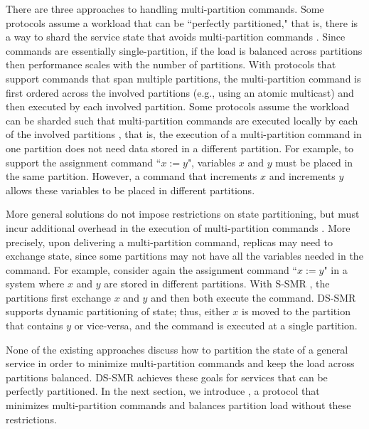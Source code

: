 There are three approaches to handling multi-partition commands.
Some protocols assume a workload that can be ``perfectly partitioned," that is, there is a way to shard the service state that avoids multi-partition commands \cite{hoang2016,Nogueira17}.
Since commands are essentially single-partition, if the load is balanced across partitions then performance scales with the number of partitions.
With protocols that support commands that span multiple partitions, the multi-partition command is first ordered across the involved partitions (e.g., using an atomic multicast) and then executed by each involved partition.
Some protocols assume the workload can be sharded such that multi-partition commands are executed locally by each of the involved partitions \cite{Mu2016}, that is, the execution of a multi-partition command in one partition does not need data stored in a different partition.
For example, to support the assignment command ``$x := y$", variables $x$ and $y$ must be placed in the same partition.
However, a command that increments $x$ and increments $y$ allows these variables to be placed in different partitions.

More general solutions do not impose restrictions on state partitioning, but must incur additional overhead in the execution of multi-partition commands \cite{bezerra2014ssmr, hoang2016}.
More precisely, upon delivering a multi-partition command, replicas may need to exchange state, since some partitions may not have all the variables needed in the command.
For example, consider again the assignment command ``$x := y$" in a system where $x$ and $y$ are stored in different partitions.
With S-SMR \cite{bezerra2014ssmr}, the partitions first exchange $x$ and $y$ and then both execute the command.
DS-SMR \cite{hoang2016} supports dynamic partitioning of state; thus, either $x$ is moved to the partition that contains $y$ or vice-versa, and the command is executed at a single partition.

None of the existing approaches discuss how to partition the state of a general service in order to minimize multi-partition commands and keep the load across partitions balanced.
DS-SMR \cite{hoang2016} achieves these goals for services that can be perfectly partitioned.
In the next section, we introduce \dynastar, a protocol that minimizes multi-partition commands and balances partition load without these restrictions. 


